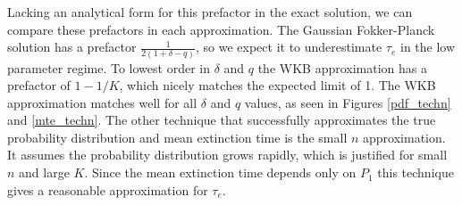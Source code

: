 Lacking an analytical form for this prefactor in the exact solution, we can compare these prefactors in each approximation. 
The Gaussian Fokker-Planck solution has a prefactor $\frac{1}{2(1+\delta-q)}$, so we expect it to underestimate $\tau_e$ in the low parameter regime. %
To lowest order in $\delta$ and $q$ the WKB approximation has a prefactor of $1-1/K$, which nicely matches the expected limit of 1. 
The WKB approximation matches well for all $\delta$ and $q$ values, as seen in Figures \ref{pdf_techn} and \ref{mte_techn}. 
The other technique that successfully approximates the true probability distribution and mean extinction time is the small $n$ approximation. %
It assumes the probability distribution grows rapidly, which is justified for small $n$ and large $K$. 
Since the mean extinction time depends only on $P_1$ this technique gives a reasonable approximation for $\tau_e$. 


